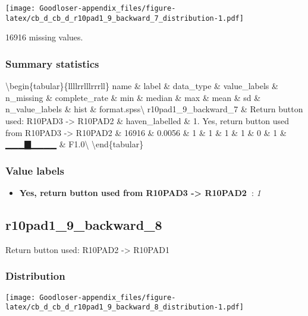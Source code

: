 \documentclass[
]{book}
\providecommand{\tightlist}{%
  \setlength{\itemsep}{0pt}\setlength{\parskip}{0pt}}
\begin{document}
\texttt{[image: Goodloser-appendix\_files/figure-latex/cb\_d\_cb\_d\_r10pad1\_9\_backward\_7\_distribution-1.pdf]}

16916 missing values.

\hypertarget{r10pad1_9_backward_7_summary}{%
\subsubsection{Summary statistics}\label{r10pad1_9_backward_7_summary}}

\textbackslash begin\{tabular\}\{l\textbar l\textbar l\textbar l\textbar r\textbar r\textbar l\textbar l\textbar l\textbar r\textbar r\textbar r\textbar l\textbar l\}
\hline
name \& label \& data\_type \& value\_labels \& n\_missing \& complete\_rate \& min \& median \& max \& mean \& sd \& n\_value\_labels \& hist \& format.spss\textbackslash{}
\hline
r10pad1\_9\_backward\_7 \& Return button used: R10PAD3 -\textgreater{} R10PAD2 \& haven\_labelled \& 1. Yes, return button used from R10PAD3 -\textgreater{} R10PAD2 \& 16916 \& 0.0056 \& 1 \& 1 \& 1 \& 1 \& 0 \& 1 \& ▁▁▁▇▁▁▁▁ \& F1.0\textbackslash{}
\hline
\textbackslash end\{tabular\}

\hypertarget{r10pad1_9_backward_7_labels}{%
\subsubsection{Value labels}\label{r10pad1_9_backward_7_labels}}

\begin{itemize}
\tightlist
\item
  \textbf{Yes, return button used from R10PAD3 -\textgreater{} R10PAD2~}: \emph{1}
\end{itemize}

\hypertarget{r10pad1_9_backward_8}{%
\subsection{r10pad1\_9\_backward\_8}\label{r10pad1_9_backward_8}}

Return button used: R10PAD2 -\textgreater{} R10PAD1

\hypertarget{r10pad1_9_backward_8_distribution}{%
\subsubsection{Distribution}\label{r10pad1_9_backward_8_distribution}}

\texttt{[image: Goodloser-appendix\_files/figure-latex/cb\_d\_cb\_d\_r10pad1\_9\_backward\_8\_distribution-1.pdf]}
\end{document}
